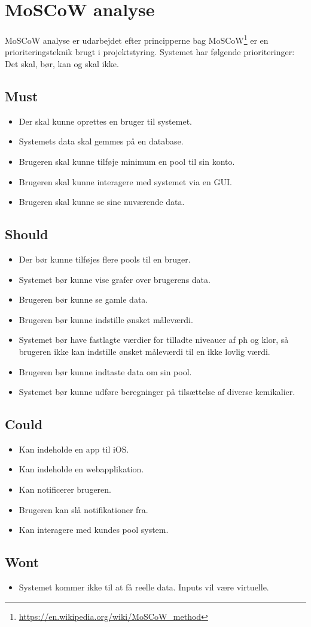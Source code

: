 \section{MoSCoW analyse}
MoSCoW analyse er udarbejdet efter principperne bag MoSCoW\footnote{\url{https://en.wikipedia.org/wiki/MoSCoW_method}} er en prioriteringsteknik brugt i projektstyring. Systemet har følgende prioriteringer: Det skal, bør, kan og skal ikke.

\subsection{Must}
\begin{itemize}
	\item Der skal kunne oprettes en bruger til systemet.
	\item Systemets data skal gemmes på en database.  
	\item Brugeren skal kunne tilføje minimum en pool til sin konto. 
	\item Brugeren skal kunne interagere med systemet via en GUI. 
	\item Brugeren skal kunne se sine nuværende data.
\end{itemize}

\subsection{Should}
\begin{itemize}
	\item Der bør kunne tilføjes flere pools til en bruger. 
	\item Systemet bør kunne vise grafer over brugerens data.
	\item Brugeren bør kunne se gamle data.
	\item Brugeren bør kunne indstille ønsket måleværdi.
	\item Systemet bør have fastlagte værdier for tilladte niveauer af ph og klor, så brugeren ikke kan indstille ønsket måleværdi til en ikke lovlig værdi.
	\item Brugeren bør kunne indtaste data om sin pool.
	\item Systemet bør kunne udføre beregninger på tilsættelse af diverse kemikalier.
\end{itemize}

\subsection{Could}
\begin{itemize}
	\item Kan indeholde en app til iOS.
	\item Kan indeholde en webapplikation.
	\item Kan notificerer brugeren.
	\item Brugeren kan slå notifikationer fra.
	\item Kan interagere med kundes pool system.
\end{itemize}

\subsection{Wont}
\begin{itemize}
	\item Systemet kommer ikke til at få reelle data. Inputs vil være virtuelle.
\end{itemize}

\newpage